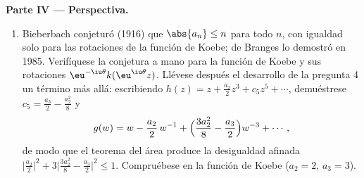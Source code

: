 \begin{problem}
\medskip
\noindent\textbf{Parte IV --- Perspectiva.}
\begin{enumerate}[resume]
  \item Bieberbach conjeturó (1916) que $\abs{a_n} \leq n$ para todo
  $n$, con igualdad solo para las rotaciones de la función de Koebe; de
  Branges lo demostró en 1985. Verifíquese la conjetura a mano para la
  función de Koebe y sus rotaciones
  $\eu^{-\iu\theta}k(\eu^{\iu\theta}z)$. Llévese después el desarrollo
  de la pregunta 4 un término más allá: escribiendo
  $h(z) = z + \frac{a_2}2z^3 + c_5z^5 + \cdots$, demuéstrese
  $c_5 = \frac{a_3}2 - \frac{a_2^2}8$ y
        \[
        g(w) = w - \frac{a_2}{2}\,w^{-1} +
        \Bigl(\frac{3a_2^2}8 - \frac{a_3}2\Bigr)w^{-3} +
        \cdots ,
        \]
        de modo que el teorema del área produce la desigualdad afinada
        $\bigl|\frac{a_2}2\bigr|^2 + 3\bigl|\frac{3a_2^2}8 -
        \frac{a_3}2\bigr|^2 \leq 1$. Compruébese en la función de Koebe
        ($a_2 = 2$, $a_3 = 3$).
\end{enumerate}


\end{problem}
